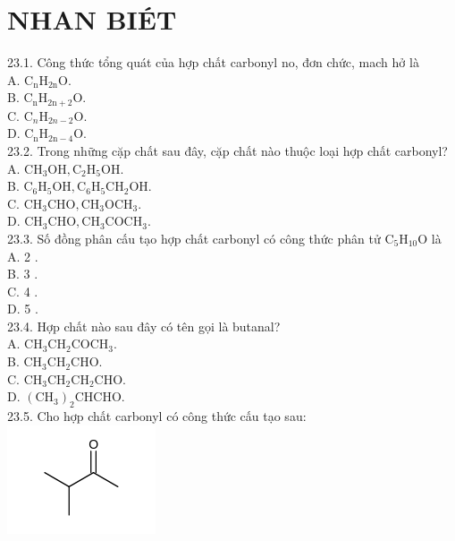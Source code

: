 \documentclass[10pt]{article}
\begin{document}
\section*{NHAN BIÉT}
23.1. Công thức tổng quát của hợp chất carbonyl no, đơn chức, mach hở là\\
A. $\mathrm{C}_{\mathrm{n}} \mathrm{H}_{2 \mathrm{n}} \mathrm{O}$.\\
B. $\mathrm{C}_{\mathrm{n}} \mathrm{H}_{2 \mathrm{n}+2} \mathrm{O}$.\\
C. $\mathrm{C}_{n} \mathrm{H}_{2 n-2} \mathrm{O}$.\\
D. $\mathrm{C}_{\mathrm{n}} \mathrm{H}_{2 \mathrm{n}-4} \mathrm{O}$.\\
23.2. Trong những cặp chất sau đây, cặp chất nào thuộc loại hợp chất carbonyl?\\
A. $\mathrm{CH}_{3} \mathrm{OH}, \mathrm{C}_{2} \mathrm{H}_{5} \mathrm{OH}$.\\
B. $\mathrm{C}_{6} \mathrm{H}_{5} \mathrm{OH}, \mathrm{C}_{6} \mathrm{H}_{5} \mathrm{CH}_{2} \mathrm{OH}$.\\
C. $\mathrm{CH}_{3} \mathrm{CHO}, \mathrm{CH}_{3} \mathrm{OCH}_{3}$.\\
D. $\mathrm{CH}_{3} \mathrm{CHO}, \mathrm{CH}_{3} \mathrm{COCH}_{3}$.\\
23.3. Số đồng phân cấu tạo hợp chất carbonyl có công thức phân tử $\mathrm{C}_{5} \mathrm{H}_{10} \mathrm{O}$ là\\
A. 2 .\\
B. 3 .\\
C. 4 .\\
D. 5 .\\
23.4. Hợp chất nào sau đây có tên gọi là butanal?\\
A. $\mathrm{CH}_{3} \mathrm{CH}_{2} \mathrm{COCH}_{3}$.\\
B. $\mathrm{CH}_{3} \mathrm{CH}_{2} \mathrm{CHO}$.\\
C. $\mathrm{CH}_{3} \mathrm{CH}_{2} \mathrm{CH}_{2} \mathrm{CHO}$.\\
D. $\left(\mathrm{CH}_{3}\right)_{2} \mathrm{CHCHO}$.\\
23.5. Cho hợp chất carbonyl có công thức cấu tạo sau:\\
\includegraphics{smile-47b9e74729c09be3446428ac1646b5fdc3a58e24}
\end{document}
